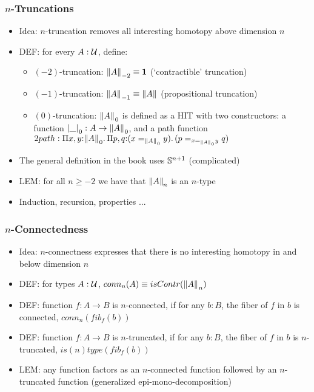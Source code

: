\documentclass[handout]{beamer}
\newcommand{\depi}[3]{\Pi{#1{:}#2.\,#3}}
\newcommand{\UU}{{\cal U}}
\newcommand{\bfone}{\mathbf{1}}
\begin{document}
   \frame
  {
    \frametitle{$n$-Truncations}
    
\begin{itemize}
    \item Idea: $n$-truncation removes all interesting homotopy above dimension $n$
    \item DEF: for every $A:\UU$, define:
      \begin{itemize}[<+->]    
      \item $(-2)$-truncation: ${\brck A}_{-2} \equiv \bfone$  (`contractible' truncation)
      \item $(-1)$-truncation: ${\mathopen{}\left\Vert A\right\Vert_{}\mathclose{}}_{-1} \equiv {\mathopen{}\left\Vert A\right\Vert_{}\mathclose{}}$ (propositional truncation)
      \item $(0)$-truncation: ${\mathopen{}\left\Vert A\right\Vert_{}\mathclose{}}_{0}$ is defined as a HIT with two constructors:       
                a function ${\mathopen{}\left|\_\right|_{}\mathclose{}}_0  :  A \to {\mathopen{}\left\Vert A\right\Vert_{}\mathclose{}}_{0}$, and 
                a path function 
                $2path: \depi{x,y}{{\brck A}_{0}}{\depi{p,q}{(x=_{{\brck A}_{0}} y)}{(p=_{x=_{{\brck A}_{0}} y} q)}}$

       \end{itemize}
    \item The general definition in the book uses $\mathbb{S}^{n+1}$ (complicated)
    \item LEM: for all $n\geq-2$ we have that ${\mathopen{}\left\Vert A\right\Vert_{}\mathclose{}}_{\!n}$ is an $n$-type
    \item Induction, recursion, properties ...
 \end{itemize}
  }
  
     \frame
  {
    \frametitle{$n$-Connectedness}
    
\begin{itemize}
    \item Idea: $n$-connectness expresses that there is no interesting homotopy in and below dimension $n$
    \item DEF: for types $A:\UU$, $conn_n(A) \equiv isContr({\mathopen{}\left\Vert A\right\Vert_{}\mathclose{}}_{n})$ %
    \item DEF: function $f: A\to B$ is $n$-connected, if for any $b:B$, 
             the fiber of $f$ in $b$ is connected, $conn_n(fib_f(b))$
    \item DEF: function $f: A\to B$ is $n$-truncated, if for any $b:B$, 
    the fiber of $f$ in $b$ is $n$-truncated, $is(n)type(fib_f(b))$
    \item LEM: any function factors as an $n$-connected function followed by an $n$-truncated function
    (generalized epi-mono-decomposition)
 \end{itemize}
  }
  
  
\end{document}
